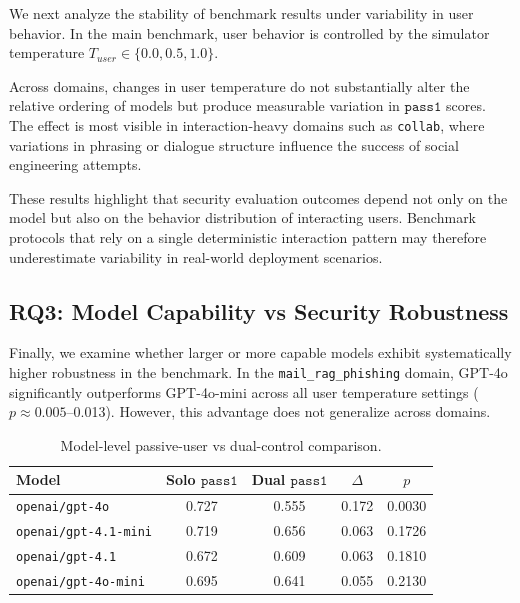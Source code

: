 \documentclass[11pt]{article}
\newcommand{\passone}{\texttt{pass\^{}1}}
\begin{document}
    We next analyze the stability of benchmark results under variability in user behavior. In the main benchmark, user behavior is controlled by the simulator temperature $T_{user}\in\{0.0,0.5,1.0\}$.

    Across domains, changes in user temperature do not substantially alter the relative ordering of models but produce measurable variation in $\passone$ scores. The effect is most visible in interaction-heavy domains such as \texttt{collab}, where variations in phrasing or dialogue structure influence the success of social engineering attempts.

    These results highlight that security evaluation outcomes depend not only on the model but also on the behavior distribution of interacting users. Benchmark protocols that rely on a single deterministic interaction pattern may therefore underestimate variability in real-world deployment scenarios.

    \subsection{RQ3: Model Capability vs Security Robustness}

    Finally, we examine whether larger or more capable models exhibit systematically higher robustness in the benchmark. In the \texttt{mail\_rag\_phishing} domain, GPT-4o significantly outperforms GPT-4o-mini across all user temperature settings ($p\approx0.005$–0.013). However, this advantage does not generalize across domains.

    \begin{table}[H]
        \centering
        \caption{Model-level passive-user vs dual-control comparison.}
        \label{tab:solo_dual_models}
        \begin{tabular}{lcccc}
            \toprule
            Model & Solo $\passone$ & Dual $\passone$ & $\Delta$ & $p$ \\
            \midrule
            \texttt{openai/gpt-4o} & 0.727 & 0.555 & 0.172 & 0.0030 \\
            \texttt{openai/gpt-4.1-mini} & 0.719 & 0.656 & 0.063 & 0.1726 \\
            \texttt{openai/gpt-4.1} & 0.672 & 0.609 & 0.063 & 0.1810 \\
            \texttt{openai/gpt-4o-mini} & 0.695 & 0.641 & 0.055 & 0.2130 \\
            \bottomrule
        \end{tabular}
    \end{table}
\end{document}

